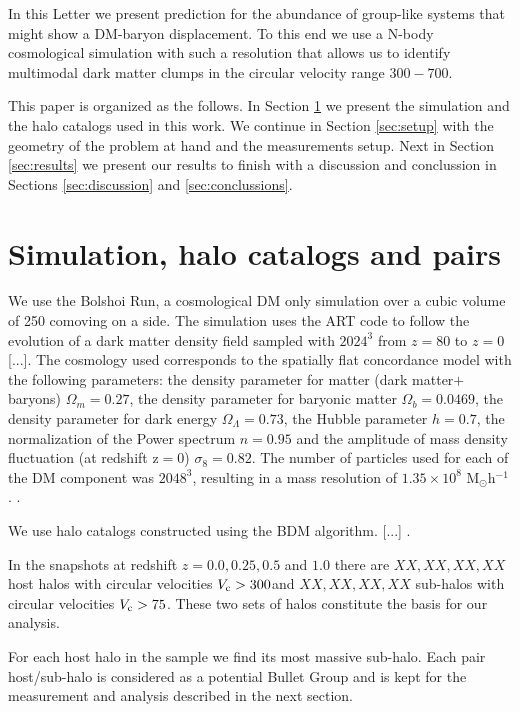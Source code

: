 \documentclass{emulateapj}
\newcommand{\hMpc}{{\ifmmode{h^{-1}{\rm Mpc}}\else{$h^{-1}$Mpc }\fi}}
\newcommand{\kms}{{\ifmmode{{\mathrm{\,km\ s}^{-1}}}\else{\,km~s$^{-1}$}\fi}}
\begin{document}
In this Letter we present prediction for the abundance of group-like
systems that might show a DM-baryon displacement. To this end we use a
N-body cosmological simulation with such a resolution that allows us
to identify multimodal dark matter clumps in the circular velocity
range $300-700$\kms. 

This paper is organized as the follows. In Section
\ref{sec:simulation} we present the simulation and the halo catalogs
used in this work. We continue in Section \ref{sec:setup} with the
geometry of the problem at hand and the measurements setup. Next in
Section \ref{sec:results} we present our results to finish with a
discussion and conclussion in Sections \ref{sec:discussion} and
\ref{sec:conclussions}. 


\section{Simulation, halo catalogs and pairs}
\label{sec:simulation}

We use the Bolshoi Run, a cosmological DM only simulation over a cubic
volume of 250 comoving \hMpc on a side. The simulation uses the ART code to
follow the evolution of  a dark matter density field sampled with
$2024^3$ from $z=80$ to $z=0$ [...]. The cosmology used  corresponds
to  the spatially flat concordance model with the following
parameters:  the density parameter for matter (dark matter$+$baryons)
$\Omega_m=0.27$, the density parameter for baryonic matter
$\Omega_b=0.0469$, the density parameter for dark energy
$\Omega_{\Lambda}=0.73$, the Hubble parameter $h=0.7$, the
normalization of the Power spectrum $n=0.95$ and the amplitude of mass
density fluctuation (at redshift z$=$0) $\sigma_8=0.82$.  The number
of particles used for each of the DM component was $2048^3$, resulting
in a mass resolution of $1.35 \times 10^8$
M$_{\odot}$h$^{-1}$. \citet{2011ApJ...740..102K}.  

We use halo catalogs constructed using the BDM algorithm. [...] \citep{Riebe2013}.


In the snapshots at redshift $z=0.0,0.25, 0.5$ and $1.0$ there are
$XX, XX, XX, XX$ host halos with circular velocities $V_{\rm c}>
300$\kms and $XX, XX, XX, XX$ sub-halos with circular velocities
$V_{\rm c}>75$\kms. These two sets of halos constitute the basis for
our analysis.

For each host halo in the sample we find its most massive
sub-halo. Each pair host/sub-halo is considered as a potential Bullet
Group and is kept for the measurement and analysis described in the
next section.
\end{document}
